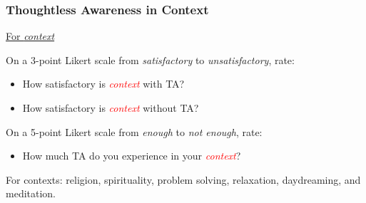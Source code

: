 \documentclass[10pt,utf8x]{beamer}
\begin{document}
\begin{frame}
  \frametitle{Thoughtless Awareness in Context}

{\Large\ul{For \emph{context}}}

On a 3-point Likert scale from \emph{satisfactory} to
\emph{unsatisfactory}, rate:

\begin{itemize}
\item How satisfactory is \textcolor{red}{\emph{context}} with TA?
\item How satisfactory is \textcolor{red}{\emph{context}} without TA?
\end{itemize}

On a 5-point Likert scale from \emph{enough} to
\emph{not enough}, rate:

\begin{itemize}
\item How much TA do you experience in your \textcolor{red}{\emph{context}}?
\end{itemize}

For contexts: religion, spirituality, problem solving, relaxation,
daydreaming, and meditation.

\end{frame}

 

\end{document}
